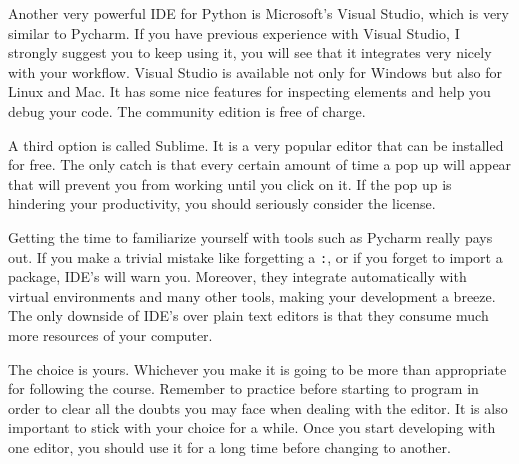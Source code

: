 Another very powerful IDE for Python is Microsoft’s Visual Studio, which is very similar to Pycharm. If you have previous experience with Visual Studio, I strongly suggest you to keep using it, you will see that it integrates very nicely with your workflow. Visual Studio is available not only for Windows but also for Linux and Mac. It has some nice features for inspecting elements and help you debug your code. The community edition is free of charge.

A third option is called Sublime. It is a very popular editor that can be installed for free. The only catch is that every certain amount of time a pop up will appear that will prevent you from working until you click on it. If the pop up is hindering your productivity, you should seriously consider the license.

Getting the time to familiarize yourself with tools such as Pycharm really pays out. If you make a trivial mistake like forgetting a \texttt{:}, or if you forget to import a package, IDE's will warn you. Moreover, they integrate automatically with virtual environments and many other tools, making your development a breeze. The only downside of IDE’s over plain text editors is that they consume much more resources of your computer. 

The choice is yours. Whichever you make it is going to be more than appropriate for following the course. Remember to practice before starting to program in order to clear all the doubts you may face when dealing with the editor. It is also important to stick with your choice for a while. Once you start developing with one editor, you should use it for a long time before changing to another.

